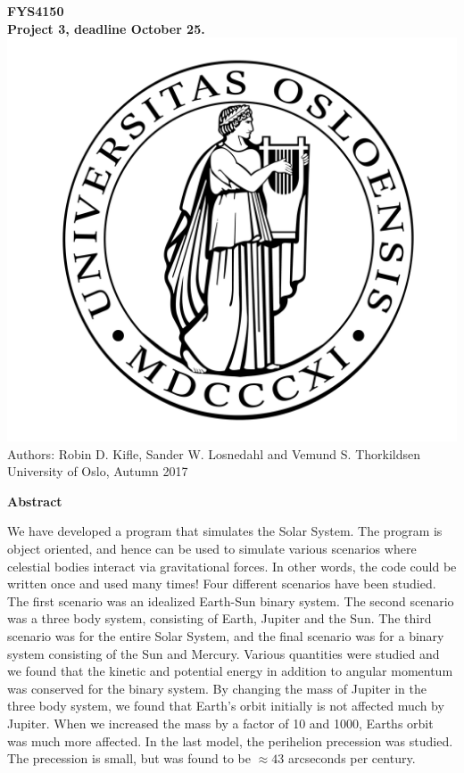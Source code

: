 \documentclass[10pt,a4paper]{article}
\begin{document}
\begin{center}
{\LARGE\bf
FYS4150\\
Project 3, deadline October 25.
}
 \includegraphics[scale=0.075]{uio.png}\\
Authors: Robin D. Kifle, Sander W. Losnedahl and Vemund S. Thorkildsen\\
University of Oslo, Autumn 2017

\vspace{3cm}
{\LARGE\bf
Abstract
}\\
\end{center}
We have developed a program that simulates the Solar System. The program is object oriented, and hence can be used to simulate various scenarios where celestial bodies interact via gravitational forces. In other words, the code could be written once and used many times! Four different scenarios have been studied. The first scenario was an idealized Earth-Sun binary system. The second scenario was a three body system, consisting of Earth, Jupiter and the Sun. The third scenario was for the entire Solar System, and the final scenario was for a binary system consisting of the Sun and Mercury. Various quantities were studied and we found that the kinetic and potential energy in addition to angular momentum was conserved for the binary system. By changing the mass of Jupiter in the three body system, we found that Earth's orbit initially is not affected much by Jupiter. When we increased the mass by a factor of 10 and 1000, Earths orbit was much more affected. In the last model, the perihelion precession was studied. The precession is small, but was found to be $\approx 43$ arcseconds per century. 
\newpage
\end{document}
